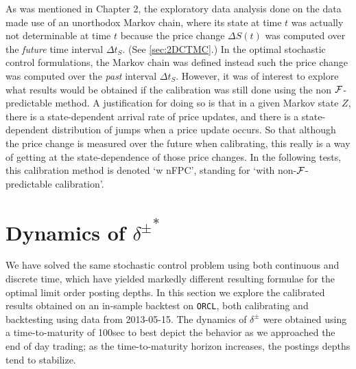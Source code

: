 As was mentioned in Chapter 2, the exploratory data analysis done on the data made use of an unorthodox Markov chain, where its state at time $t$ was actually not determinable at time $t$ because the price change $\Delta S(t)$ was computed over the \emph{future} time interval $\Delta t_S$. (See \autoref{sec:2DCTMC}.) In the optimal stochastic control formulations, the Markov chain was defined instead such the price change was computed over the \emph{past} interval $\Delta t_S$. However, it was of interest to explore what results would be obtained if the calibration was still done using the non $\mathcal{F}$-predictable method. A justification for doing so is that in a given Markov state $Z$, there is a state-dependent arrival rate of price updates, and there is a state-dependent distribution of jumps when a price update occurs. So that although the price change is measured over the future when calibrating, this really is a way of getting at the state-dependence of those price changes. In the following tests, this calibration method is denoted `w nFPC', standing for `with non-$\mathcal{F}$-predictable calibration'.

\section{Dynamics of \texorpdfstring{${\delta^{\pm}}^*$}{delta}}

We have solved the same stochastic control problem using both continuous and discrete time, which have yielded markedly different resulting formulae for the optimal limit order posting depths. In this section we explore the calibrated results obtained on an in-sample backtest on \texttt{ORCL}, both calibrating and backtesting using data from 2013-05-15. The dynamics of $\delta^\pm$ were obtained using a time-to-maturity of 100sec to best depict the behavior as we approached the end of day trading; as the time-to-maturity horizon increases, the postings depths tend to stabilize. 

